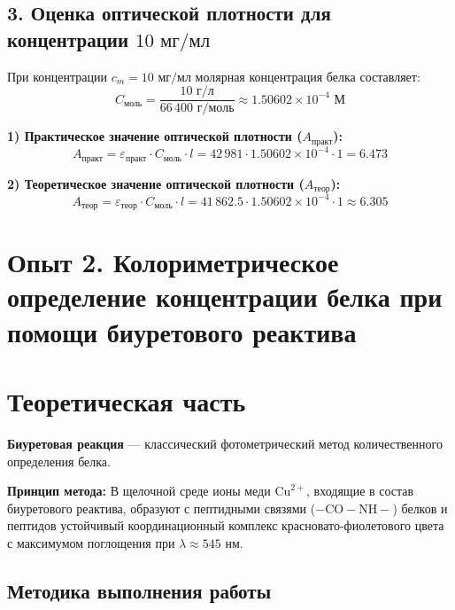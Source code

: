 \documentclass[a4paper,12pt]{article}
\begin{document}
\subsection*{3. Оценка оптической плотности для концентрации $10\text{ мг/мл}$}

При концентрации $c_m = 10\text{ мг/мл}$ молярная концентрация белка составляет:
\[
C_{\text{моль}} = \frac{10\text{ г/л}}{66\,400\text{ г/моль}} \approx 1.50602 \times 10^{-4}\text{ М}
\]

\textbf{1) Практическое значение оптической плотности ($A_{\text{практ}}$):}
\[
A_{\text{практ}} = \varepsilon_{\text{практ}} \cdot C_{\text{моль}} \cdot l = 42\,981 \cdot 1.50602 \times 10^{-4} \cdot 1 = 6.473
\]

\textbf{2) Теоретическое значение оптической плотности ($A_{\text{теор}}$):}
\[
A_{\text{теор}} = \varepsilon_{\text{теор}} \cdot C_{\text{моль}} \cdot l = 41\,862.5 \cdot 1.50602 \times 10^{-4} \cdot 1 \approx 6.305
\]

\newpage 


\section*{Опыт 2. Колориметрическое определение концентрации белка при
помощи биуретового реактива}

\section*{Теоретическая часть}

\textbf{Биуретовая реакция} — классический фотометрический метод количественного определения белка.

\textbf{Принцип метода:} В щелочной среде ионы меди $\text{Cu}^{2+}$, входящие в состав биуретового реактива, образуют с пептидными связями ($-\text{CO}-\text{NH}-$) белков и пептидов устойчивый координационный комплекс красновато-фиолетового цвета с максимумом поглощения при $\lambda \approx 545\text{ нм}$.


\subsection*{Методика выполнения работы}
\end{document}
